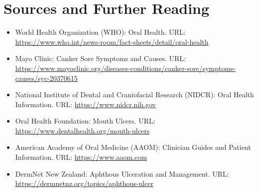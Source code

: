 \section*{Sources and Further Reading}
\begin{itemize}
    \item World Health Organization (WHO): Oral Health. URL: \url{https://www.who.int/news-room/fact-sheets/detail/oral-health}
    \item Mayo Clinic: Canker Sore Symptoms and Causes. URL: \url{https://www.mayoclinic.org/diseases-conditions/canker-sore/symptoms-causes/syc-20370615}
    \item National Institute of Dental and Craniofacial Research (NIDCR): Oral Health Information. URL: \url{https://www.nidcr.nih.gov}
    \item Oral Health Foundation: Mouth Ulcers. URL: \url{https://www.dentalhealth.org/mouth-ulcers}
    \item American Academy of Oral Medicine (AAOM): Clinician Guides and Patient Information. URL: \url{https://www.aaom.com}
    \item DermNet New Zealand: Aphthous Ulceration and Management. URL: \url{https://dermnetnz.org/topics/aphthous-ulcer}
\end{itemize}
